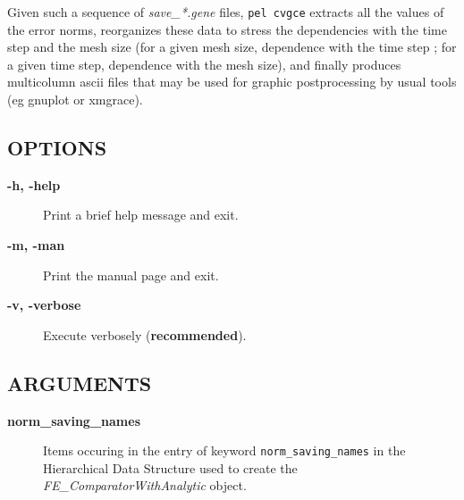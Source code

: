 \documentclass{article}
\begin{document}
Given such a sequence of \emph{save\_*.gene} files, \texttt{pel cvgce} extracts
all the values of the error norms, reorganizes these data to stress the
dependencies with the time step and the mesh size (for a given mesh size,
dependence with the time step ; for a given time step, dependence with
the mesh size), and finally produces multicolumn ascii files that may be
used for graphic postprocessing by usual tools (eg gnuplot or xmgrace).

\subsection*{OPTIONS\label{cvgce_OPTIONS}}
\begin{description}

\item[\textbf{-h, -help}] \mbox{}

Print a brief help message and exit.


\item[\textbf{-m, -man}] \mbox{}

Print the manual page and exit.


\item[\textbf{-v, -verbose}] \mbox{}

Execute verbosely (\textbf{recommended}).

\end{description}
\subsection*{ARGUMENTS\label{cvgce_ARGUMENTS}}
\begin{description}

\item[\textbf{norm\_saving\_names}] \mbox{}

Items occuring in the entry of keyword \texttt{norm\_saving\_names}
in the Hierarchical Data Structure used to create the
\emph{FE\_ComparatorWithAnalytic} object.

\end{description}
\end{document}
